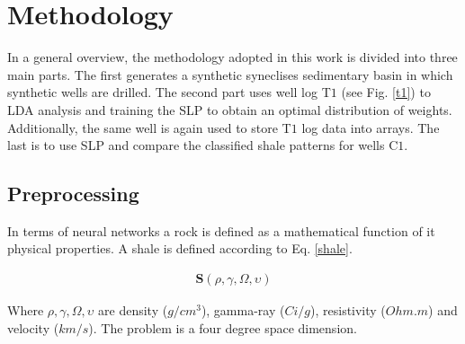 \documentclass{cilamce19}
\begin{document}
\section{Methodology}

In a general overview, the methodology adopted in this work is divided into three main parts. The first generates a synthetic syneclises sedimentary basin in which synthetic wells are drilled. The second part uses well log T$1$  (see Fig. \ref{t1}) to LDA analysis and training the SLP to obtain an optimal distribution of weights. Additionally, the same well is again used to store T$1$ log data into arrays. The last is to use SLP and compare the classified shale patterns for  wells C$1$.

\begin{center}


\end{center}


\subsection{Preprocessing}

In terms of neural networks a rock is defined as a mathematical function of it physical properties. A shale is defined according to Eq. \ref{shale}.

\begin{eqnarray}
\textbf{S}(\rho, \gamma, \Omega,\upsilon )
\label{shale}
\end{eqnarray}

Where $\rho, \gamma, \Omega,\upsilon $ are density ($g/cm^{3}$), gamma-ray ($Ci/g$), resistivity ($Ohm.m$) and velocity ($km/s$). The problem is a four degree space dimension. 
\end{document}

